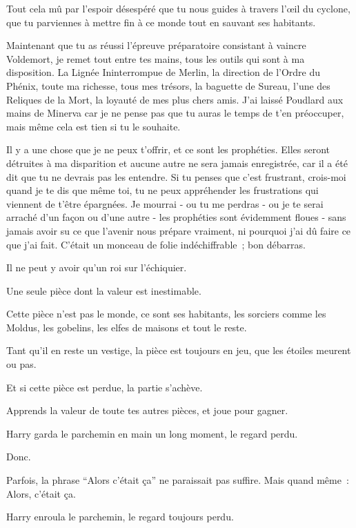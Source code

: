 \begin{writtenNote}
Tout cela mû par l'espoir désespéré que tu nous guides à travers l'œil du cyclone, que tu parviennes à mettre fin à ce monde tout en sauvant ses habitants.

Maintenant que tu as réussi l'épreuve préparatoire consistant à vaincre Voldemort, je remet tout entre tes mains, tous les outils qui sont à ma disposition. La Lignée Ininterrompue de Merlin, la direction de l'Ordre du Phénix, toute ma richesse, tous mes trésors, la baguette de Sureau, l'une des Reliques de la Mort, la loyauté de mes plus chers amis. J'ai laissé Poudlard aux mains de Minerva car je ne pense pas que tu auras le temps de t'en préoccuper, mais même cela est tien si tu le souhaite.

Il y a une chose que je ne peux t'offrir, et ce sont les prophéties. Elles seront détruites à ma disparition et aucune autre ne sera jamais enregistrée, car il a été dit que tu ne devrais pas les entendre. Si tu penses que c'est frustrant, crois-moi quand je te dis que même toi, tu ne peux appréhender les frustrations qui viennent de t'être épargnées. Je mourrai - ou tu me perdras - ou je te serai arraché d'un façon ou d'une autre - les prophéties sont évidemment floues - sans jamais avoir su ce que l'avenir nous prépare vraiment, ni pourquoi j'ai dû faire ce que j'ai fait. C'était un monceau de folie indéchiffrable~; bon débarras.

Il ne peut y avoir qu'un roi sur l'échiquier.

Une seule pièce dont la valeur est inestimable.

Cette pièce n'est pas le monde, ce sont ses habitants, les sorciers comme les Moldus, les gobelins, les elfes de maisons et tout le reste.

Tant qu'il en reste un vestige, la pièce est toujours en jeu, que les étoiles meurent ou pas.

Et si cette pièce est perdue, la partie s'achève.

Apprends la valeur de toute tes autres pièces, et joue pour gagner.

\end{writtenNote}

\later

Harry garda le parchemin en main un long moment, le regard perdu.

Donc.

Parfois, la phrase “Alors c'était ça” ne paraissait pas suffire. Mais quand même~: Alors, c'était ça.

Harry enroula le parchemin, le regard toujours perdu.

